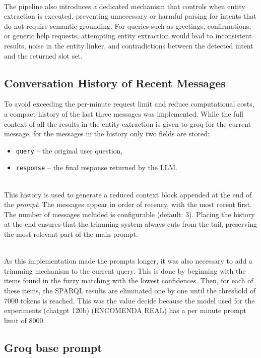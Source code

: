 \documentclass[conference]{IEEEtran}
\begin{document}
\noindent
\\
The pipeline also introduces a dedicated mechanism that controls when entity extraction is executed, preventing unnecessary or harmful parsing for intents that do not require semantic grounding. For queries such as greetings, confirmations, or generic help requests, attempting entity extraction would lead to inconsistent results, noise in the entity linker, and contradictions between the detected intent and the returned slot set.




\subsection*{Conversation History of Recent Messages}

To avoid exceeding the per-minute request limit and reduce computational costs, a compact history of the last three messages was implemented. While the full context of all the results in the entity extraction is given to groq for the current message, for the messages in the history only two fields are stored:

\begin{itemize}
    \item \verb|query| – the original user question,
    \item \verb|response| – the final response returned by the LLM.
\end{itemize}

\noindent
\\
This history is used to generate a reduced context block appended at the end of the \textit{prompt}. The messages appear in order of recency, with the most recent first. The number of messages included is configurable (default: 3). Placing the history at the end ensures that the trimming system always cuts from the tail, preserving the most relevant part of the main prompt.

\noindent
\\
As this implementation made the prompts longer, it was also necessary to add a trimming mechanism to the current query. This is done by beginning with the items found in the fuzzy matching with the lowest confidences. Then, for each of these items, the SPARQL results are eliminated one by one until the threshold of 7000 tokens is reached. This was the value decide because the model used for the experiments (chatgpt 120b) (ENCOMENDA REAL) has a per minute prompt limit of 8000. 


\subsection{Groq base prompt}
\end{document}
